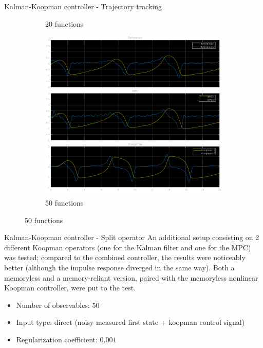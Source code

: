 \documentclass{beamer}
\begin{document}
\begin{frame}{Kalman-Koopman controller - Trajectory tracking}
\begin{figure}
\begin{subfigure}[b]{0.3\textwidth}
            \caption{20 functions}
        \end{subfigure}
        \hfill
        \begin{subfigure}[b]{0.3\textwidth}
            \centering
            \includegraphics[width=\textwidth]{KK_50_Ref.png}
            \caption{50 functions}
        \end{subfigure}
    \end{figure}
\end{frame}

\begin{frame}{Kalman-Koopman controller - Split operator}
    An additional setup consisting on 2 different Koopman operators (one for the Kalman filter and one for the MPC) was tested; compared to the combined controller, the results were noticeably better (although the impulse response diverged in the same way). Both a memoryless and a memory-reliant version, paired with the memoryless nonlinear Koopman controller, were put to the test.

    \begin{itemize}
        \item Number of observables: $50$
        \item Input type: direct (noisy measured first state + koopman control signal)
        \item Regularization coefficient: $0.001$
    \end{itemize}
\end{frame}
\end{document}

